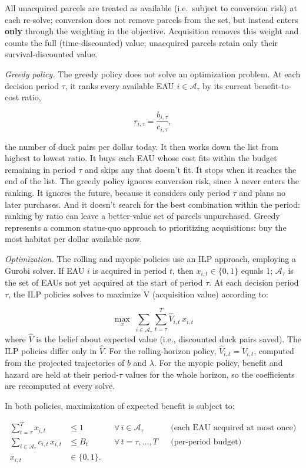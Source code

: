 \documentclass[
  letterpaper,
  DIV=11,
  numbers=noendperiod]{scrartcl}
\begin{document}
All unacquired parcels are treated as available (i.e.~subject to
conversion risk) at each re-solve; conversion does not remove parcels
from the set, but instead enters \textbf{only} through the weighting in
the objective. Acquisition removes this weight and counts the full
(time-discounted) value; unacquired parcels retain only their
survival-discounted value.

\emph{Greedy policy.} The greedy policy does not solve an optimization
problem. At each decision period \(\tau\), it ranks every available EAU
\(i \in \mathcal{A}_\tau\) by its current benefit-to-cost ratio,

\[r_{i,\tau} = \frac{b_{i,\tau}}{c_{i,\tau}},\]

the number of duck pairs per dollar today. It then works down the list
from highest to lowest ratio. It buys each EAU whose cost fits within
the budget remaining in period \(\tau\) and skips any that doesn't fit.
It stops when it reaches the end of the list. The greedy policy ignores
conversion risk, since \(\lambda\) never enters the ranking. It ignores
the future, because it considers only period \(\tau\) and plans no later
purchases. And it doesn't search for the best combination within the
period: ranking by ratio can leave a better-value set of parcels
unpurchased. Greedy represents a common status-quo approach to
prioritizing acquisitions: buy the most habitat per dollar available
now.

\emph{Optimization.} The rolling and myopic policies use an ILP
approach, employing a Gurobi solver. If EAU \(i\) is acquired in period
\(t\), then \(x_{i,t} \in \{0,1\}\) equals 1; \(\mathcal{A}_\tau\) is
the set of EAUs not yet acquired at the start of period \(\tau\). At
each decision period \(\tau\), the ILP policies solves to maximize V
(acquisition value) according to:

\[\max_{x} \; \sum_{i \in \mathcal{A}_\tau} \sum_{t=\tau}^{T} \hat{V}_{i,t}\, x_{i,t}\]
where \(\hat{V}\) is the belief about expected value (i.e., discounted
duck pairs saved). The ILP policies differ only in \(\hat{V}\). For the
rolling-horizon policy, \(\hat{V}_{i,t} = V_{i,t}\), computed from the
projected trajectories of \(b\) and \(\lambda\). For the myopic policy,
benefit and hazard are held at their period-\(\tau\) values for the
whole horizon, so the coefficients are recomputed at every solve.

In both policies, maximization of expected benefit is subject to:

\[\begin{aligned}
\sum_{t=\tau}^{T} x_{i,t} &\le 1 && \forall\, i \in \mathcal{A}_\tau && \text{(each EAU acquired at most once)} \\
\sum_{i \in \mathcal{A}_\tau} c_{i,t}\, x_{i,t} &\le B_t && \forall\, t = \tau, \dots, T && \text{(per-period budget)} \\
x_{i,t} &\in \{0,1\}.
\end{aligned}\]
\end{document}
